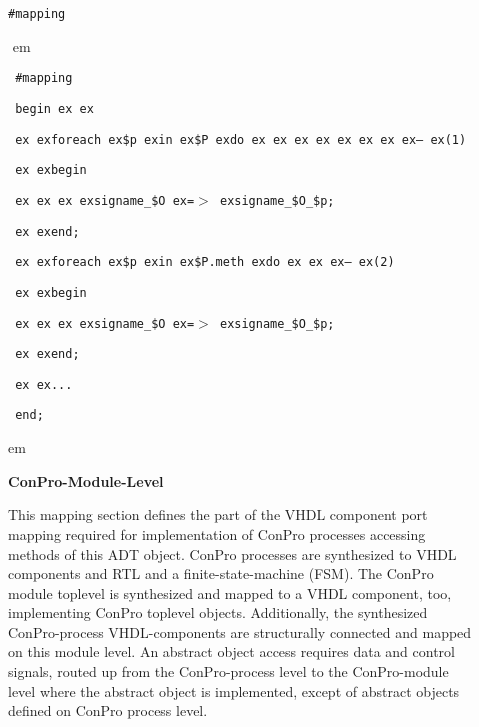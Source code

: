 \documentclass[a4paper,12pt,twoside,english]{article}
\def\s{\hskip 1.15 ex}
\begin{document}
\def\thesubsection{\tocXCVII}
\secII{\label{toclabelXCVII}\thesubsection}
\begin{description}
\item[] $ $\\
{\tt \#mapping}

\item[]
\def\prefskipu{}\def\prefskipo{}\def\prefskipa{}\def\prefskipu{\hskip10pt}\def\prefskipo{\hskip10pt}\def\prefskipa{\hskip20pt}\def\content{
\vskip-5pt{\parindent0pt\parbox{\linewidth}{\tt\smallsize\hskip10pt \#mapping}}
\vskip-5pt{\parindent0pt\parbox{\linewidth}{\tt\smallsize\hskip10pt begin\s \s }}
\vskip-5pt{\parindent0pt\parbox{\linewidth}{\tt\smallsize\hskip10pt \s \s foreach\s \$p\s in\s \$P\s do\s \s \s \s \s \s \s \s --\s (1)}}
\vskip-5pt{\parindent0pt\parbox{\linewidth}{\tt\smallsize\hskip10pt \s \s begin}}
\vskip-5pt{\parindent0pt\parbox{\linewidth}{\tt\smallsize\hskip10pt \s \s \s \s signame\_\$O\s =$>$\s signame\_\$O\_\$p;}}
\vskip-5pt{\parindent0pt\parbox{\linewidth}{\tt\smallsize\hskip10pt \s \s end;}}
\vskip-5pt{\parindent0pt\parbox{\linewidth}{\tt\smallsize\hskip10pt \s \s foreach\s \$p\s in\s \$P.meth\s do\s \s \s --\s (2)}}
\vskip-5pt{\parindent0pt\parbox{\linewidth}{\tt\smallsize\hskip10pt \s \s begin}}
\vskip-5pt{\parindent0pt\parbox{\linewidth}{\tt\smallsize\hskip10pt \s \s \s \s signame\_\$O\s =$>$\s signame\_\$O\_\$p;}}
\vskip-5pt{\parindent0pt\parbox{\linewidth}{\tt\smallsize\hskip10pt \s \s end;}}
\vskip-5pt{\parindent0pt\parbox{\linewidth}{\tt\smallsize\hskip10pt \s \s ...}}
\vskip-5pt{\parindent0pt\parbox{\linewidth}{\tt\smallsize\hskip10pt end;}}
}
$ $
 em
\content
{} em
\item[] $ $\\
{\bfseries ConPro-Module-Level}

This mapping section defines the part of the VHDL component port mapping required for implementation of ConPro processes accessing methods of this ADT object.
ConPro processes are synthesized to VHDL components and RTL and a finite-state-machine (FSM). The ConPro module toplevel is synthesized and mapped to a VHDL 
component, too, implementing ConPro toplevel objects. Additionally, the synthesized ConPro-process VHDL-components are structurally connected and mapped on this
module level. An abstract object access requires data and control signals, routed up from the ConPro-process level to the ConPro-module level where the abstract
object is implemented, except of abstract objects defined on ConPro process level.


\end{description}
\end{document}
